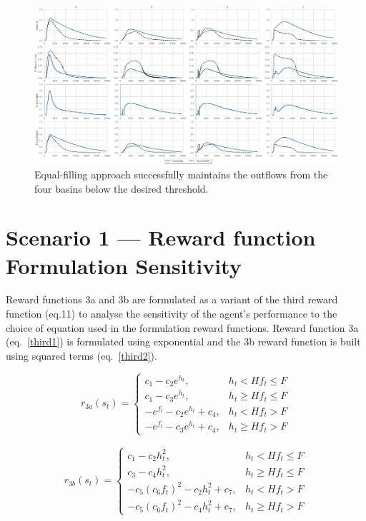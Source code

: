 \begin{figure}[H]
    \centering
    \includegraphics[width=\linewidth]{RL-SI-figures/eqf.eps}
    \caption{Equal-filling approach successfully maintains the outflows from the four basins below the desired threshold.}\label{fig:12}
\end{figure}

\section{Scenario 1 --- Reward function Formulation Sensitivity}\label{SI:reward-math}

\noindent Reward functions 3a and 3b are formulated as a variant of the third reward function (eq.11) to analyse the sensitivity of the agent's performance to the choice of equation used in the formulation reward functions.
Reward function 3a (eq.~\ref{third1}) is formulated using exponential and the 3b reward function is built using squared terms (eq.~\ref{third2}).

\begin{equation}
  r_{3a} (s_t) = \left\{ \begin{array}{ll}
    c_1 - c_2 e^{h_t}, & h_t < Hf_t \leq F\\
    c_1 - c_3 e^{h_t}, & h_t \geq Hf_t \leq F\\
    - e^{f_t} - c_2 e^{h_t} + c_4, & h_t < Hf_t > F\\
    - e^{f_t} - c_3 e^{h_t} + c_4, & h_t \geq Hf_t > F
  \end{array} \right.\label{third1}
\end{equation}

\begin{align}
  r_{3b} (s_t) = \left\{ \begin{array}{ll}
    c_1 - c_2 h_t^2, & h_t < Hf_t \leq F\\
    c_3 - c_4 h_t^2, & h_t \geq Hf_t \leq F\\
    - c_5 {(c_6 f_t)}^2 - c_2 h_t^2 + c_7, & h_t < Hf_t > F\\
    - c_5 {(c_6 f_t)}^2 - c_4 h_t^2 + c_7, & h_t \geq Hf_t > F
  \end{array} \right.\label{third2}
\end{align}


